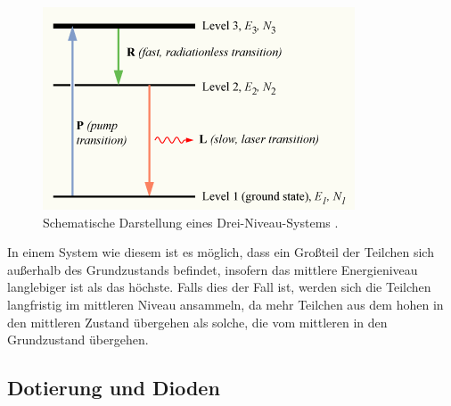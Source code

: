 \begin{figure}[H]
    \centering
    \includegraphics[width=\textwidth]{data/dreiniveau.png}
    \caption{Schematische Darstellung eines Drei-Niveau-Systems \cite{Dreiniveau}.}
    \label{fig:dreiniveau}
\end{figure}
\noindent
In einem System wie diesem ist es möglich, dass ein Großteil der Teilchen sich außerhalb des Grundzustands befindet, insofern das mittlere Energieniveau langlebiger
ist als das höchste. Falls dies der Fall ist, werden sich die Teilchen langfristig im mittleren Niveau ansammeln, da mehr Teilchen aus dem hohen in den mittleren Zustand
übergehen als solche, die vom mittleren in den Grundzustand übergehen. 


\subsection{Dotierung und Dioden}

